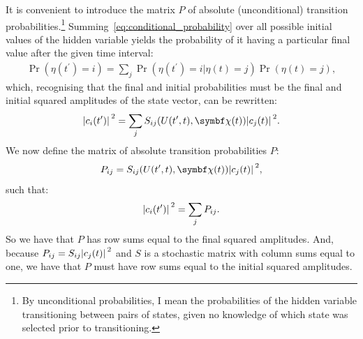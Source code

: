 It is convenient to introduce the matrix $P$ of absolute (unconditional) transition probabilities.\footnote{By unconditional probabilities, I mean the probabilities of the hidden variable transitioning between pairs of states, given no knowledge of which state was selected prior to transitioning.} Summing~\eqref{eq:conditional_probability} over all possible initial values of the hidden variable yields the probability of it having a particular final value after the given time interval:
\begin{align}
\Pr(\eta(t^\prime){=}i) 
= \sum_j \Pr(\eta(t^\prime){=}i|\eta(t){=}j) \Pr(\eta(t){=}j),
\end{align}
which, recognising that the final and initial probabilities must be the final and initial squared amplitudes of the state vector, can be rewritten:
\begin{align}
\abs{c_i(t^\prime)}^2
= \sum_j S_{ij}(U(t^\prime, t), \vec\chi(t)) \abs{c_j(t)}^2.
\end{align}
We now define the matrix of absolute transition probabilities $P$:
\begin{align}\label{eq:P_matrix_def}
P_{ij} = S_{ij}(U(t^\prime, t), \vec\chi(t)) \abs{c_j(t)}^2,
\end{align}
such that:
\begin{align}
\abs{c_i(t^\prime)}^2
= \sum_j P_{ij}.
\end{align}
So we have that $P$ has row sums equal to the final squared amplitudes.
And, because $P_{ij} = S_{ij}\abs{c_j(t)}^2$ and $S$ is a stochastic matrix with column sums equal to one, we have that $P$ must have row sums equal to the initial squared amplitudes.

